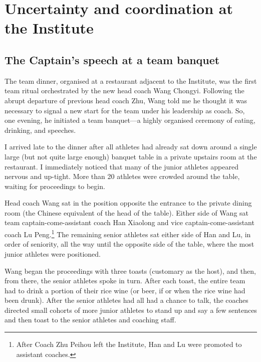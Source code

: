 \chapter{\label{chap:ethnoField} Uncertainty and coordination at the Institute}

\minitoc




\begin{CJK}{UTF8}{gbsn}



\section{The Captain's speech at a team banquet\label{sect:captainsSpeech}}

  The team dinner, organised at a restaurant adjacent to the Institute, was the first team ritual orchestrated by the new head coach Wang Chongyi. Following the abrupt departure of previous head coach Zhu, Wang told me he thought it was necessary to signal a new start for the team under his leadership as coach. So, one evening, he initiated a team banquet---a highly organised ceremony of eating, drinking, and speeches.

  I arrived late to the dinner after all athletes had already sat down around a single large (but not quite large enough) banquet table in a private upstairs room at the restaurant.  I immediately noticed that many of the junior athletes appeared nervous and up-tight. More than 20 athletes were crowded around the table, waiting for proceedings to begin.

  Head coach Wang sat in the position opposite the entrance to the private dining room (the Chinese equivalent of the head of the table).  Either side of Wang sat team captain-come-assistant coach Han Xiaolong and vice captain-come-assistant coach Lu Peng.\footnote{After Coach Zhu Peihou left the Institute, Han and Lu were promoted to assistant coaches.} The remaining senior athletes sat either side of Han and Lu, in order of seniority, all the way until the opposite side of the table, where the most junior athletes were positioned.

  Wang began the proceedings with three toasts (customary as the host), and then, from there, the senior athletes spoke in turn.  After each toast, the entire team had to drink a portion of their rice wine (or beer, if or when the rice wine had been drunk).  After the senior athletes had all had a chance to talk, the coaches directed small cohorts of more junior athletes to stand up and say a few sentences and then toast to the senior athletes and coaching staff.


\end{CJK}
